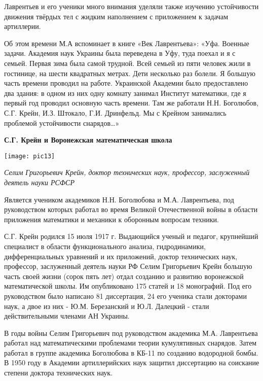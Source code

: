 Лаврентьев и его ученики много внимания уделяли также изучению устойчивости движения твёрдых тел с жидким наполнением с приложением к задачам артиллерии.

Об этом времени М.А вспоминает в книге «Век Лаврентьева»: «Уфа. Военные задачи. Академия наук Украины была переведена в Уфу, туда поехал и я с семьей. Первая зима была самой трудной. Всей семьей из пяти человек жили в гостинице, на шести квадратных метрах. Дети несколько раз болели. Я большую часть времени проводил на работе. Украинской Академии было предоставлено два здания: в одном из них одну комнату занимал Институт математики, где я первый год проводил основную часть времени. Там же работали Н.Н. Боголюбов, С.Г. Крейн, И.З. Штокало, Г.И. Дринфельд. Мы с Крейном занимались проблемой устойчивости снарядов…»


\begin{center}
{\bf С.Г. Крейн и Воронежская математическая школа}

\vspace{3mm}

\texttt{[image: pic13]}


{\it Селим Григорьевич Крейн, доктор технических наук,
 профессор, заслуженный деятель науки РСФСР}
\end{center}

Является учеником академиков Н.Н. Боголюбова и М.А. Лаврентьева, под руководством которых работал во время Великой Отечественной войны в области приложения математики и механики к оборонным вопросам техники.

С.Г. Крейн родился 15 июля 1917 г. Выдающийся ученый и педагог, крупнейший специалист в области функционального анализа, гидродинамики, дифференциальных уравнений и их приложений, доктор технических наук, профессор, заслуженный деятель науки РФ Селим Григорьевич Крейн большую часть своей жизни (сорок пять лет) отдал созданию и развитию воронежской математической школы. Им опубликовано 175 статей и 18 монографий. Под его руководством было написано 81 диссертация, 24 его ученика стали докторами наук, а двое из них - Ю.М. Березанский и Ю.Л. Далецкий - стали действительными членами АН Украины.

В годы войны Селим Григорьевич под руководством академика М.А. Лаврентьева работал над математическими проблемами теории кумулятивных снарядов. Затем работал в группе академика Боголюбова в КБ-11 по созданию водородной бомбы. В 1950 году в Академии артиллерийских наук защитил диссертацию на соискание степени доктора технических наук.

